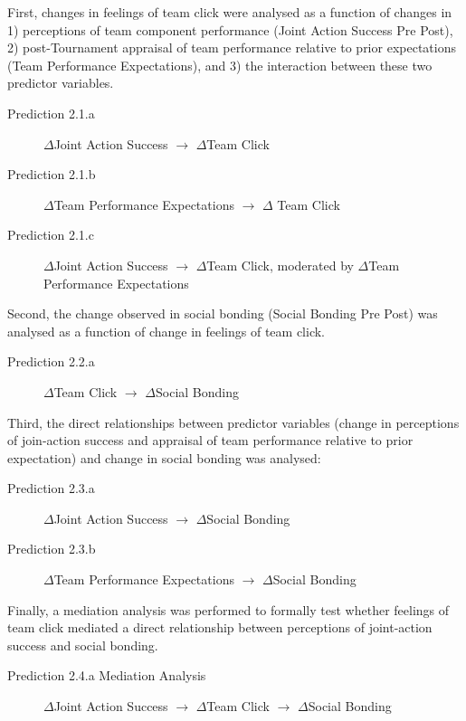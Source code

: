 {First, changes in feelings of team click were analysed as a function of changes in 1) perceptions of team component performance (Joint Action Success Pre Post), 2) post-Tournament appraisal of team performance relative to prior expectations (Team Performance Expectations), and 3) the interaction between these two predictor variables.
\bigskip
\begin{description}
  \item [Prediction 2.1.a] $\Delta$Joint Action Success  $\rightarrow$  $\Delta$Team Click
  \item [Prediction 2.1.b] $\Delta$Team Performance Expectations $\rightarrow$ $\Delta$ Team Click
  \item [Prediction 2.1.c] $\Delta$Joint Action Success $\rightarrow$ $\Delta$Team Click, moderated by $\Delta$Team Performance Expectations
\end{description}

Second, the change observed in social bonding (Social Bonding Pre Post) was analysed as a function of change in feelings of team click.
\bigskip
\begin{description}
  \item [Prediction 2.2.a] $\Delta$Team Click $\rightarrow$ $\Delta$Social Bonding
\end{description}

Third, the direct relationships between predictor variables (change in perceptions of join-action success and appraisal of team performance relative to prior expectation) and change in social bonding was analysed:
\bigskip
\begin{description}
  \item [Prediction 2.3.a] $\Delta$Joint Action Success $\rightarrow$ $\Delta$Social Bonding
  \item [Prediction 2.3.b] $\Delta$Team Performance Expectations $\rightarrow$ $\Delta$Social Bonding
\end{description}

Finally, a mediation analysis was performed to formally test whether feelings of team click mediated a direct relationship between perceptions of joint-action success and social bonding.

\begin{description}
  \item[Prediction 2.4.a Mediation Analysis] $\Delta$Joint Action Success $\rightarrow$ $\Delta$Team Click $\rightarrow$ $\Delta$Social Bonding
\end{description}

}
